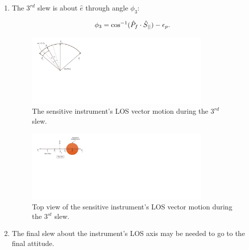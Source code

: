 \documentclass[journal ]{new-aiaa}
\begin{document}
\begin{enumerate}[label=\Roman*)]
		\item The $3^{rd}$ slew is about $\hat{e}$ through angle $\phi_3$:

		\begin{equation}\label{phi3_3}
		\phi_3 = \cos^{-1}(\hat{P}_f\cdot\hat{S}_{||})-\epsilon_p.\\
		\end{equation}
		\begin{figure}[h!]
			\centering
				\includegraphics[width=3.5in]{SVAS_4r_modified}
					\caption{The sensitive instrument's LOS vector motion during the $3^{rd}$ slew.}
		\end{figure}

		\begin{figure}[h!]
			\centering
				\includegraphics[width=3.5in]{SVAS_4rb_modified}
				\caption{Top view of the sensitive instrument's LOS vector motion during the $3^{st}$ slew.}
\end{figure}
		\item The final slew about the instrument's LOS axis may be needed to go to the final attitude. 
	\end{enumerate}
	
	
\end{document}
